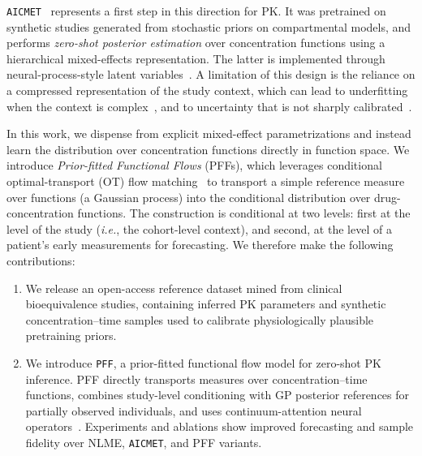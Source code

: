 \texttt{AICMET}~\citep{marin2025amortized} represents a first step in this direction for PK.
%
It was pretrained on synthetic studies generated from stochastic priors on compartmental models, and performs \textit{zero-shot posterior estimation} over concentration functions using a hierarchical mixed-effects representation.
%
The latter is implemented through neural-process-style latent variables~\citep{garnelo2018neural}.
%
A limitation of this design is the reliance on a compressed representation of the study context, which can lead to underfitting when the context is complex~\citep{kim2019attentive}, and to uncertainty that is not sharply calibrated~\citep{wang2025bridge}.

In this work, we dispense from explicit mixed-effect parametrizations and instead learn the distribution over concentration functions directly in function space.
%
We introduce \textit{Prior-fitted Functional Flows} (PFFs), which leverages conditional optimal-transport (OT) flow matching~\citep{kerrigan2024dynamic} to transport a simple reference measure over functions (a Gaussian process) into the conditional distribution over drug-concentration functions. 
%
The construction is conditional at two levels: first at the level of the study (\textit{i.e.}, the cohort-level context), and second, at the level of a patient’s early measurements for forecasting.
%
We therefore make the following contributions:

\begin{enumerate}
    \item We release an open-access reference dataset mined from clinical bioequivalence studies, containing inferred PK parameters and synthetic concentration--time samples used to calibrate physiologically plausible pretraining priors.

    \item We introduce \texttt{PFF}, a prior-fitted functional flow model for zero-shot PK inference. PFF directly transports measures over concentration--time functions, combines study-level conditioning with GP posterior references for partially observed individuals, and uses continuum-attention neural operators~\citep{calvello2024continuum}. Experiments and ablations show improved forecasting and sample fidelity over NLME, \texttt{AICMET}, and PFF variants.
\end{enumerate}

